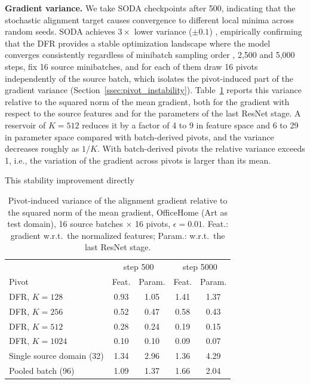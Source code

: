 \documentclass[preprint,12pt]{elsarticle}
\providecommand{\DIFadd}[1]{{\protect\color{blue} \sf #1}} %
\providecommand{\DIFdel}[1]{{\protect\color{red} \scriptsize #1}} %
\providecommand{\DIFaddbegin}{} %
\providecommand{\DIFaddend}{} %
\providecommand{\DIFdelbegin}{} %
\providecommand{\DIFdelend}{} %
\providecommand{\DIFaddFL}[1]{\DIFadd{#1}} %
\newcommand{\DIFscaledelfig}{0.5}
\newlength{\DIFdelgraphicswidth} %
\newlength{\DIFdelgraphicsheight} %
\newcommand{\DIFaddincludegraphics}[2][]{{\color{blue}\fbox{\DIFOincludegraphics[#1]{#2}}}} %
\newcommand{\DIFdelincludegraphics}[2][]{%
\sbox{\DIFdelgraphicsbox}{\DIFOincludegraphics[#1]{#2}}%
\settoboxwidth{\DIFdelgraphicswidth}{\DIFdelgraphicsbox} %
\settoboxtotalheight{\DIFdelgraphicsheight}{\DIFdelgraphicsbox} %
\scalebox{\DIFscaledelfig}{%
\parbox[b]{\DIFdelgraphicswidth}{\usebox{\DIFdelgraphicsbox}\\[-\baselineskip] \rule{\DIFdelgraphicswidth}{0em}}\llap{\resizebox{\DIFdelgraphicswidth}{\DIFdelgraphicsheight}{%
\setlength{\unitlength}{\DIFdelgraphicswidth}%
\begin{picture}(1,1)%
\thicklines\linethickness{2pt} %
{\color[rgb]{1,0,0}\put(0,0){\framebox(1,1){}}}%
{\color[rgb]{1,0,0}\put(0,0){\line( 1,1){1}}}%
{\color[rgb]{1,0,0}\put(0,1){\line(1,-1){1}}}%
\end{picture}%
}\hspace*{3pt}}} %
} %
\DeclareRobustCommand{\DIFaddbegin}{\DIFOaddbegin \let\includegraphics\DIFaddincludegraphics} %
\DeclareRobustCommand{\DIFaddend}{\DIFOaddend \let\includegraphics\DIFOincludegraphics} %
\DeclareRobustCommand{\DIFdelbegin}{\DIFOdelbegin \let\includegraphics\DIFdelincludegraphics} %
\DeclareRobustCommand{\DIFdelend}{\DIFOaddend \let\includegraphics\DIFOincludegraphics} %
\begin{document}
\DIFadd{\textbf{Gradient variance.} We take SODA checkpoints after 500}\DIFaddend , \DIFdelbegin \DIFdel{indicating that the stochastic alignment target causes convergence to different local minima across random seeds.
SODA achieves $3\times$ lower variance ($\pm 0.1$)}\DIFdelend \DIFaddbegin \DIFadd{1}\DIFaddend ,\DIFdelbegin \DIFdel{empirically confirming that the DFR provides a stable optimization landscape where the model converges consistently regardless of minibatch sampling order}\DIFdelend \DIFaddbegin \DIFadd{000, 2,500 and 5,000 steps, fix 16 source minibatches, and for each of them draw 16 pivots independently of the source batch, which isolates the pivot-induced part of the gradient variance (Section~\ref{ssec:pivot_instability}). Table~\ref{tab:gradvar} reports this variance relative to the squared norm of the mean gradient, both for the gradient with respect to the source features and for the parameters of the last ResNet stage. A reservoir of $K=512$ reduces it by a factor of 4 to 9 in feature space and 6 to 29 in parameter space compared with batch-derived pivots, and the variance decreases roughly as $1/K$. With batch-derived pivots the relative variance exceeds 1, i.e., the variation of the gradient across pivots is larger than its mean}\DIFaddend .

\DIFdelbegin \DIFdel{This stability improvement directly }\DIFdelend \DIFaddbegin \begin{table}[t]
\caption{\DIFaddFL{Pivot-induced variance of the alignment gradient relative to the squared norm of the mean gradient, OfficeHome (Art as test domain), 16 source batches $\times$ 16 pivots, $\epsilon=0.01$. Feat.: gradient w.r.t.\ the normalized features; Param.: w.r.t.\ the last ResNet stage.}}
\label{tab:gradvar}
\centering
\small
\begin{tabular}{lcccc}
\toprule
 & \multicolumn{2}{c}{step 500} & \multicolumn{2}{c}{step 5000} \\
Pivot & Feat. & Param. & Feat. & Param. \\
\midrule
DFR, $K=128$ & 0.93 & 1.05 & 1.41 & 1.37 \\
DFR, $K=256$ & 0.52 & 0.47 & 0.58 & 0.43 \\
DFR, $K=512$ & 0.28 & 0.24 & 0.19 & 0.15 \\
DFR, $K=1024$ & 0.10 & 0.10 & 0.09 & 0.07 \\
Single source domain (32) & 1.34 & 2.96 & 1.36 & 4.29 \\
Pooled batch (96) & 1.09 & 1.37 & 1.66 & 2.04 \\
\bottomrule
\end{tabular}
\end{table}
\end{document}
